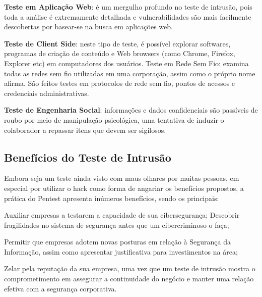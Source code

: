 \textbf{Teste em Aplicação Web}: é um mergulho profundo no teste de intrusão, pois toda a análise é extremamente detalhada e vulnerabilidades são mais facilmente descobertas por basear-se na busca em aplicações web.

\textbf{Teste de Client Side}: neste tipo de teste, é possível explorar softwares, programas de criação de conteúdo e Web browsers (como Chrome, Firefox, Explorer etc) em computadores dos usuários.
Teste em Rede Sem Fio: examina todas as redes sem fio utilizadas em uma corporação, assim como o próprio nome afirma. São feitos testes em protocolos de rede sem fio, pontos de acessos e credenciais administrativas.

\textbf{Teste de Engenharia Social}: informações e dados confidenciais são passíveis de roubo por meio de manipulação psicológica, uma tentativa de induzir o colaborador a repassar itens que devem ser sigilosos.

\subsection{Benefícios do Teste de Intrusão}

Embora seja um teste ainda visto com maus olhares por muitas pessoas, em especial por utilizar o hack como forma de angariar os benefícios propostos, a prática do Pentest apresenta inúmeros benefícios, sendo os principais:

Auxiliar empresas a testarem a capacidade de sua cibersegurança;
Descobrir fragilidades no sistema de segurança antes que um cibercriminoso o faça;

Permitir que empresas adotem novas posturas em relação à Segurança da Informação, assim como apresentar justificativa para investimentos na área;

Zelar pela reputação da sua empresa, uma vez que um teste de intrusão mostra o comprometimento em assegurar a continuidade do negócio e manter uma relação efetiva com a segurança corporativa.

\nocite{pentest}